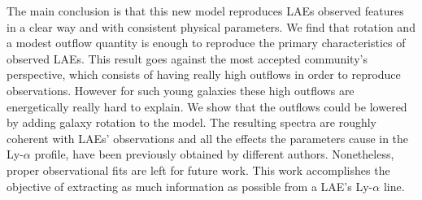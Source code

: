 \documentclass[11pt,a4paper]{article}
\begin{document}
The main conclusion is that this new model reproduces LAEs observed features in a clear way and with consistent physical parameters. We find that rotation and a modest outflow quantity is enough to reproduce the primary characteristics of observed LAEs. This result goes against the most accepted community's perspective, which consists of having really high outflows in order to reproduce observations. However for such young galaxies these high outflows are energetically really hard to explain. We show that the outflows could be lowered by adding galaxy rotation to the model. The resulting spectra are roughly coherent with LAEs' observations and all the effects the parameters cause in the Ly-$\alpha$ profile, have been previously obtained by different authors. Nonetheless, proper observational fits are left for future work. This work accomplishes the objective of extracting as much information as possible from a LAE's Ly-$\alpha$ line.\\




\end{document}

